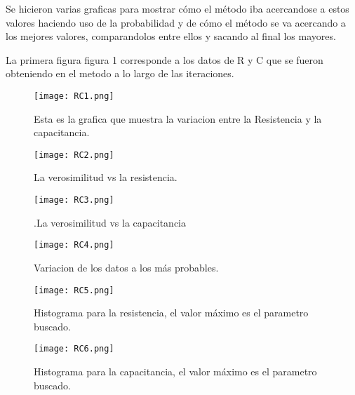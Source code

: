 \documentclass[a4paper]{article}
\begin{document}
Se hicieron varias graficas para mostrar cómo el método iba acercandose a estos valores haciendo uso de la probabilidad y de cómo el método se va acercando a los mejores valores, comparandolos entre ellos y sacando al final los mayores.

La primera figura figura 1 corresponde a los datos de R y C que se fueron obteniendo en el metodo a lo largo de las iteraciones.

\begin{figure}
\centering
\texttt{[image: RC1.png]}
\caption{\label{fig:RC1}Esta es la grafica que muestra la variacion entre la Resistencia y la capacitancia.}
\end{figure}

\begin{figure}
\centering
\texttt{[image: RC2.png]}
\caption{\label{fig:RC2} La verosimilitud vs la resistencia.}
\end{figure}

\begin{figure}
\centering
\texttt{[image: RC3.png]}
\caption{\label{fig:RC3}.La verosimilitud vs la capacitancia}
\end{figure}

\begin{figure}
\centering
\texttt{[image: RC4.png]}
\caption{\label{fig:RC4} Variacion de los datos a los más probables.}
\end{figure}

\begin{figure}
\centering
\texttt{[image: RC5.png]}
\caption{\label{fig:RC5}Histograma para la resistencia, el valor máximo es el parametro buscado.}
\end{figure}

\begin{figure}
\centering
\texttt{[image: RC6.png]}
\caption{\label{fig:RC6}Histograma para la capacitancia, el valor máximo es el parametro buscado.}
\end{figure}
\end{document}
